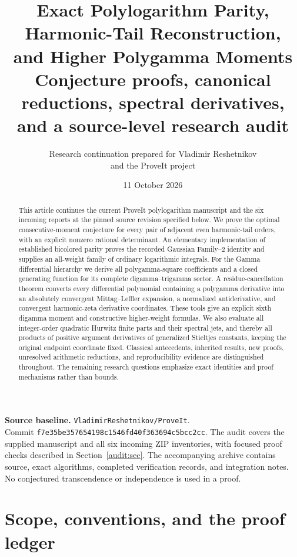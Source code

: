 \documentclass[11pt,a4paper]{article}
\title{\textbf{Exact Polylogarithm Parity, Harmonic-Tail Reconstruction,\\
and Higher Polygamma Moments}\\[5pt]
\large Conjecture proofs, canonical reductions, spectral derivatives,\\
and a source-level research audit}
\author{Research continuation prepared for Vladimir Reshetnikov\\
and the ProveIt project}
\date{11 October 2026}
\numberwithin{equation}{section}
\theoremstyle{definition}
\theoremstyle{remark}
\begin{document}
\maketitle
\begin{abstract}
This article continues the current ProveIt polylogarithm manuscript and
the six incoming reports at the pinned source revision specified below.
We prove the optimal consecutive-moment conjecture for every pair of
adjacent even harmonic-tail orders, with an explicit nonzero rational
determinant.  An elementary implementation of established bicolored
parity proves the recorded Gaussian Family--2 identity and supplies an
all-weight family of ordinary logarithmic integrals.  For the Gamma
differential hierarchy we derive all polygamma-square coefficients and
a closed generating function for its complete digamma--trigamma sector.
A residue-cancellation theorem converts every differential polynomial
containing a polygamma derivative into an absolutely convergent
Mittag--Leffler expansion, a normalized antiderivative, and convergent
harmonic-zeta derivative coordinates.  These tools give an explicit
sixth digamma moment and constructive higher-weight formulas.
We also evaluate all integer-order quadratic Hurwitz finite parts and
their spectral jets, and thereby all products of positive argument
derivatives of generalized Stieltjes constants, keeping the original
endpoint coordinate fixed.
Classical antecedents, inherited results, new proofs, unresolved
arithmetic reductions, and reproducibility evidence are distinguished
throughout.  The remaining research questions emphasize exact
identities and proof mechanisms rather than bounds.
\end{abstract}

\vspace{3pt}
\noindent\textbf{Source baseline.}
\texttt{VladimirReshetnikov/ProveIt}.\\
Commit \texttt{f7e35be357654198c1546fd40f363694c5bcc2cc}.
The audit covers the supplied manuscript and all six incoming ZIP
inventories, with focused proof checks described in Section~\ref{audit:sec}.
The accompanying archive contains source, exact algorithms, completed
verification records, and integration notes.  No conjectured
transcendence or independence is used in a proof.

\clearpage
{\small\setlength{\parskip}{0pt}\tableofcontents}
\newpage

\section{Scope, conventions, and the proof ledger}
\label{scope:sec}
\end{document}
